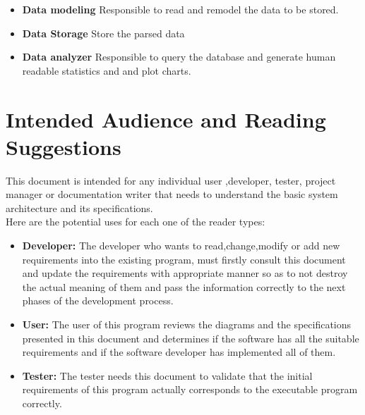 \documentclass{scrreprt}
\begin{document}
\begin{itemize}
  \item \textbf{Data modeling} \- Responsible to read and remodel the data to be stored.
  \item \textbf{Data Storage} \- Store the parsed data
  \item \textbf{Data analyzer} \- Responsible to query the database and generate
    human readable statistics and and plot charts.
\end{itemize}




 \section{Intended Audience and Reading Suggestions}
This document is intended for any individual user ,developer, tester, project manager or
documentation writer that needs to understand the basic system architecture and its specifications.\\
Here are the potential uses for each one of the reader types:\\
\begin{itemize}

\item \textbf{Developer: }The developer who wants to read,change,modify or add new requirements into
the existing program, must firstly consult this document and update the requirements with
appropriate manner so as to not destroy the actual meaning of them and pass the information
correctly to the next phases of the development process.\\

\item \textbf{User: }The user of this program reviews the diagrams and the specifications presented in this
document and determines if the software has all the suitable requirements and if the software
developer has implemented all of them.\\

\item \textbf{Tester: }The tester needs this document to validate that the initial requirements of this
program actually corresponds to the executable program correctly.\\

\end{itemize}
\end{document}
